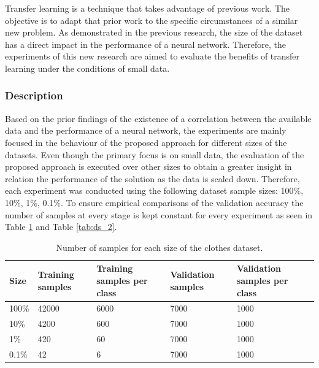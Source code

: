 \documentclass{article}
\begin{document}
Transfer learning is a technique that takes advantage of previous work. The objective is to adapt that prior work to the specific circumstances of a similar new problem. As demonstrated in the previous research, the size of the dataset has a direct impact in the performance of a neural network. Therefore, the experiments of this new research are aimed to evaluate the benefits of transfer learning under the conditions of small data.

\subsubsection{\textbf{Description}}

Based on the prior findings of the existence of a correlation between the available data and the performance of a neural network, the experiments are mainly focused in the behaviour of the proposed approach for different sizes of the datasets. Even though the primary focus is on small data, the evaluation of the proposed approach is executed over other sizes to obtain a greater insight in relation the performance of the solution as the data is scaled down. Therefore, each experiment was conducted using the following dataset sample sizes: 100\%, 10\%, 1\%, 0.1\%. To ensure empirical comparisons of the validation accuracy the number of samples at every stage is kept constant for every experiment as seen in Table \ref{tab:ds_1} and Table \ref{tab:ds_2}.

\begin{table}[!htb]
  \centering
  \begin{tabular}{| l | l | l | l | l |}
    \hline
    \textbf{Size} & \textbf{Training samples} & \textbf{Training samples per class} & \textbf{Validation samples} & \textbf{Validation samples per class} \\ \hline
    100\% & 42000 & 6000 & 7000 & 1000 \\ \hline
    10\% & 4200 & 600 & 7000 & 1000 \\ \hline
    1\% & 420  & 60 & 7000 & 1000 \\ \hline
    0.1\% & 42 & 6 & 7000 & 1000 \\ \hline
  \end{tabular}
  \caption{Number of samples for each size of the clothes dataset.}
  \label{tab:ds_1}
\end{table}  
  
\end{document}
